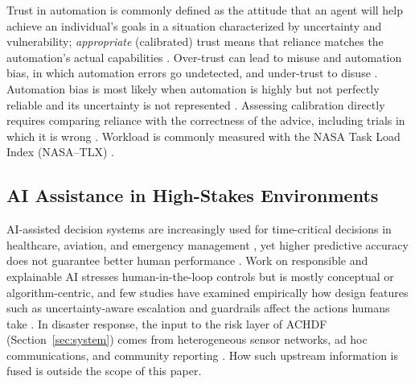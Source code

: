 \documentclass[journal]{IEEEtran}
\theoremstyle{plain}
\theoremstyle{definition}
\begin{document}
Trust in automation is commonly defined as the attitude that an agent will help achieve an individual's goals in a situation characterized by uncertainty and vulnerability; \emph{appropriate} (calibrated) trust means that reliance matches the automation's actual capabilities \cite{Lee2004}. Over-trust can lead to misuse and automation bias, in which automation errors go undetected, and under-trust to disuse \cite{Lee2004,Parasuraman2010,Raji2019AIES,Raji2022CACM}. Automation bias is most likely when automation is highly but not perfectly reliable and its uncertainty is not represented \cite{Parasuraman2010,Weidinger2022FAccT}. Assessing calibration directly requires comparing reliance with the correctness of the advice, including trials in which it is wrong \cite{Lee2004,Parasuraman2010}. Workload is commonly measured with the NASA Task Load Index (NASA--TLX) \cite{Hart1988}.

\subsection{AI Assistance in High-Stakes Environments}
AI-assisted decision systems are increasingly used for time-critical decisions in healthcare, aviation, and emergency management \cite{PerezCerrolaza2024CSUR,Bach2024Access,Rokhideh2025IJDRS,Rao2024IJDRS}, yet higher predictive accuracy does not guarantee better human performance \cite{Lai2023FAccT,Yang2022THMSReview}. Work on responsible and explainable AI stresses human-in-the-loop controls \cite{Weidinger2022FAccT,Assaad2023TAS,Miller2019XRDS,PerezCerrolaza2024CSUR} but is mostly conceptual or algorithm-centric, and few studies have examined empirically how design features such as uncertainty-aware escalation and guardrails affect the actions humans take \cite{Bach2024Access,Lai2023FAccT}. In disaster response, the input to the risk layer of ACHDF (Section~\ref{sec:system}) comes from heterogeneous sensor networks, ad hoc communications, and community reporting \cite{Yang2005MobiHoc,Longo2025PMC}. How such upstream information is fused is outside the scope of this paper.


\end{document}
